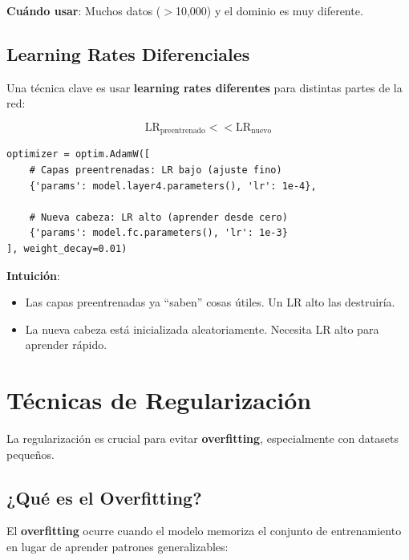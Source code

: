 \documentclass[12pt,a4paper]{article}
\begin{document}
\textbf{Cuándo usar}: Muchos datos ($>$10,000) y el dominio es muy diferente.

\subsection{Learning Rates Diferenciales}

Una técnica clave es usar \textbf{learning rates diferentes} para distintas partes de la red:

\begin{equation}
\text{LR}_{\text{preentrenado}} << \text{LR}_{\text{nuevo}}
\end{equation}

\begin{lstlisting}[caption={Learning rates diferenciales en PyTorch}]
optimizer = optim.AdamW([
    # Capas preentrenadas: LR bajo (ajuste fino)
    {'params': model.layer4.parameters(), 'lr': 1e-4},

    # Nueva cabeza: LR alto (aprender desde cero)
    {'params': model.fc.parameters(), 'lr': 1e-3}
], weight_decay=0.01)
\end{lstlisting}

\textbf{Intuición}:
\begin{itemize}
    \item Las capas preentrenadas ya ``saben'' cosas útiles. Un LR alto las destruiría.
    \item La nueva cabeza está inicializada aleatoriamente. Necesita LR alto para aprender rápido.
\end{itemize}

\section{Técnicas de Regularización}

La regularización es crucial para evitar \textbf{overfitting}, especialmente con datasets pequeños.

\subsection{¿Qué es el Overfitting?}

El \textbf{overfitting} ocurre cuando el modelo memoriza el conjunto de entrenamiento en lugar de aprender patrones generalizables:
\end{document}

